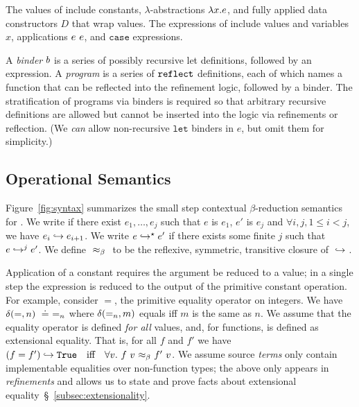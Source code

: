 %


%
The values of \corelan include
constants, $\lambda$-abstractions
$\efun{x}{\typ}{e}$, and fully
applied data constructors $D$
that wrap values.
%
The expressions of \corelan
include values and variables $x$,
applications $\eapp{e}{e}$, and
$\mathtt{case}$ expressions.

%
A \emph{binder} $\bd$ is a series of possibly recursive
let definitions, followed by an expression.
%
A \emph{program} \prog is a series of $\erefname$
definitions, each of which names a function
that can be reflected into the refinement
logic, followed by a binder.
%
The stratification of programs via binders
is required so that arbitrary recursive definitions
are allowed but cannot be inserted into the logic
via refinements or reflection.
%
(We \emph{can} allow non-recursive $\mathtt{let}$
binders in $e$, but omit them for simplicity.)

\subsection{Operational Semantics}

Figure~\ref{fig:syntax} summarizes the small
step contextual $\beta$-reduction semantics for
\corelan.
%
%
We write  if there exist
$e_1,\ldots,e_j$ such that $e$ is $e_1$,
$e'$ is $e_j$ and $\forall i,j, 1 \leq i < j$,
we have $\evals{e_i}{e_{i+1}}$.
%
We write $\evalsto{e}{e'}$ if there exists
some finite $j$ such that $\evalj{e}{e'}{j}$.
%
We define $\betaeq{}{}$ to be the reflexive,
symmetric, transitive closure of $\evals{}{}$.

 Application of a constant requires the
argument be reduced to a value; in a single step the
expression is reduced to the output of the primitive
constant operation.
%
For example, consider $=$, the primitive equality
operator on integers.
%
We have $\ceval{=}{n} \defeq =_n$
where $\ceval{=_n}{m}$ equals \etrue
iff $m$ is the same as $n$.
%
%
We assume that the equality operator
is defined \emph{for all} values,
and, for functions, is defined as
extensional equality.
%
That is, for all
$f$ and
$f'$
we have
$\evals{(f = f')}{\etrue}
  \quad \mbox{iff} \quad
  \forall v.\ \betaeq{f\ v}{f'\ v}$.
%
We assume source \emph{terms} only contain implementable equalities
over non-function types; the above only appears in \emph{refinements}
and allows us to state and prove facts about extensional
equality~\S~\ref{subsec:extensionality}.

